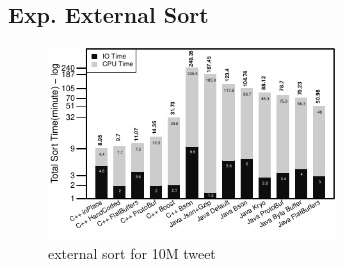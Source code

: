 \subsection{Exp. External Sort}
\begin{figure}
	\centering
	\includegraphics[width=\columnwidth,height=2in,keepaspectratio]{../../RScripts/Experiment_External_Sort_CPU_IO_Bar_10M.pdf}
	\caption{external sort for 10M tweet}
	\label{fig:exp_memory}
\end{figure}